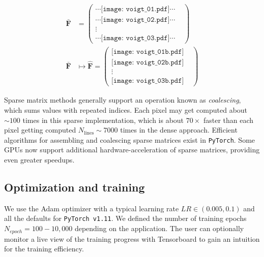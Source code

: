 \documentclass[trackchanges]{aastex631}
\begin{document}
\begin{equation} \label{eqnPictograph}
    \begin{aligned}
        \bm{\bar{F}} & =
        \begin{pmatrix}
            \cdots \texttt{[image: voigt\_01.pdf]}  \cdots & \\
            \cdots \texttt{[image: voigt\_02.pdf]}  \cdots & \\
            \vdots                                                    & \\
            \cdots \texttt{[image: voigt\_03.pdf]} \cdots  &
        \end{pmatrix}                        \\
        \bm{\bar{F}} & \mapsto \bm{\hat{F}} =\begin{pmatrix}
                                                 \texttt{[image: voigt\_01b.pdf]} & \\
                                                 \texttt{[image: voigt\_02b.pdf]} & \\
                                                 \vdots                                      & \\
                                                 \texttt{[image: voigt\_03b.pdf]} &
                                             \end{pmatrix}
    \end{aligned}
\end{equation}


Sparse matrix methods generally support an operation known as \emph{coalescing}, which sums values with repeated indices. Each pixel may get computed about $\sim100$ times in this sparse implementation, which is about $70\times$ faster than each pixel getting computed $N_\mathrm{lines}\sim7000$ times in the dense approach.  Efficient algorithms for assembling and coalescing sparse matrices exist in \texttt{PyTorch}.  Some GPUs now support additional hardware-acceleration of sparse matrices, providing even greater speedups.



\subsection{Optimization and training}

We use the Adam optimizer \citep{2014arXiv1412.6980K} with a typical learning rate $LR\in (0.005, 0.1)$ and all the defaults for \texttt{PyTorch v1.11}.  We defined the number of training epochs $N_{epoch}=100-10,000$ depending on the application. The user can optionally monitor a live view of the training progress with Tensorboard \citep{tensorflow2015-whitepaper} to gain an intuition for the training efficiency.
\end{document}
